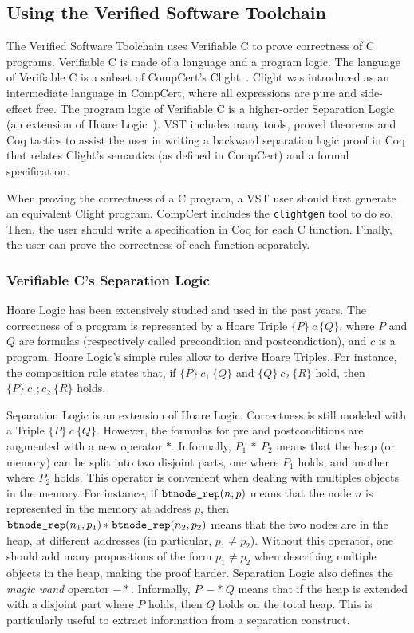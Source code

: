 \subsection{Using the Verified Software Toolchain}
The Verified Software Toolchain uses Verifiable C to prove correctness of C programs.
Verifiable C is made of a language and a program logic.
The language of Verifiable C is a subset of CompCert's Clight~\cite{clight}.
Clight was introduced as an intermediate language in CompCert, where all expressions are pure and side-effect free.
The program logic of Verifiable C is a higher-order Separation Logic~\cite{sep} (an extension of Hoare Logic~\cite{hoare}).
VST includes many tools, proved theorems and Coq tactics to assist the user in writing a backward separation logic proof in Coq that relates Clight's semantics (as defined in CompCert) and a formal specification.

When proving the correctness of a C program, a VST user should first generate an equivalent Clight program.
CompCert includes the \texttt{clightgen} tool to do so. Then, the user should write a specification in Coq for each C function.
Finally, the user can prove the correctness of each function separately.

\subsubsection{Verifiable C's Separation Logic}
Hoare Logic has been extensively studied and used in the past years.
The correctness of a program is represented by a Hoare Triple $\{P\}~c~\{Q\}$, where $P$ and $Q$ are formulas (respectively called precondition and postcondiction), and $c$ is a program.
Hoare Logic's simple rules allow to derive Hoare Triples. For instance, the composition rule states that, if $\{P\}~c_1~\{Q\}$ and $\{Q\}~c_2~\{R\}$ hold, then $\{P\}~c_1;c_2~\{R\}$ holds.

Separation Logic is an extension of Hoare Logic. Correctness is still modeled with a Triple $\{P\}~c~\{Q\}$. However, the formulas for pre and postconditions are augmented with a new operator $*$.
Informally, $P_1~*~P_2$ means that the heap (or memory) can be split into two disjoint parts, one where $P_1$ holds, and another where $P_2$ holds.
This operator is convenient when dealing with multiples objects in the memory.
For instance, if $\texttt{btnode\_rep}(n,p)$ means that the node $n$ is represented in the memory at address $p$, then $\texttt{btnode\_rep}(n_1,p_1)*\texttt{btnode\_rep}(n_2,p_2)$ means that the two nodes are in the heap, at different addresses (in particular, $p_1\neq p_2$).
Without this operator, one should add many propositions of the form $p_1\neq p_2$ when describing multiple objects in the heap, making the proof harder.
Separation Logic also defines the \textit{magic wand} operator $-*$. Informally, $P~-*~Q$ means that if the heap is extended with a disjoint part where $P$ holds, then $Q$ holds on the total heap.
This is particularly useful to extract information from a separation construct. 

